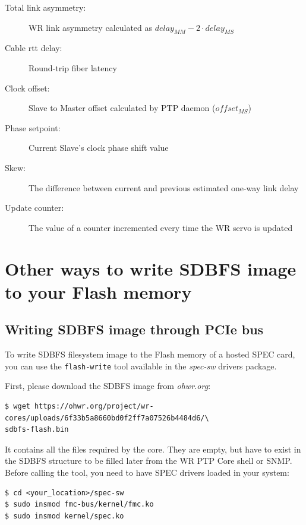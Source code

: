 \documentclass[a4paper, 12pt]{article}
\renewcommand{\_}{\underscore\allowbreak}
\begin{document}
\begin{description}
\item[Total link asymmetry:] WR link asymmetry calculated as
    $delay_{MM} - 2 \cdot delay_{MS}$

\item[Cable rtt delay:] Round-trip fiber latency

\item[Clock offset:] Slave to Master offset calculated by PTP daemon
  ($ offset_{MS} $)

\item[Phase setpoint:] Current Slave's clock phase shift value

\item[Skew:] The difference between current and previous estimated
    one-way link delay

\item[Update counter:] The value of a counter incremented every time
    the WR servo is updated

\end{description}
\renewcommand\arraystretch{1}


\clearpage
\section{Other ways to write SDBFS image to your Flash memory}
\label{appendix:writing_sdbfs}

\subsection{Writing SDBFS image through PCIe bus}
To write SDBFS filesystem image to the Flash memory of a hosted SPEC card, you
can use the \texttt{flash-write} tool available in the \emph{spec-sw} drivers
package.

First, please download the SDBFS image from \textit{ohwr.org}:
\begin{lstlisting}
$ wget https://ohwr.org/project/wr-cores/uploads/6f33b5a8660bd0f2ff7a07526b4484d6/\
sdbfs-flash.bin
\end{lstlisting}
It contains all the files required by the core. They are empty, but have to
exist in the SDBFS structure to be filled later from the WR PTP Core shell or
SNMP.\\

Before calling the tool, you need to have SPEC drivers loaded in your system:
\begin{lstlisting}
$ cd <your_location>/spec-sw
$ sudo insmod fmc-bus/kernel/fmc.ko
$ sudo insmod kernel/spec.ko
\end{lstlisting}
\end{document}
